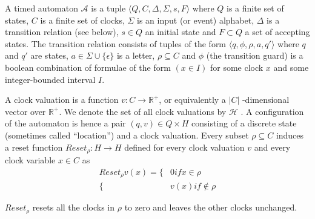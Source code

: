 \documentclass[]{sigplanconf}
\begin{document}
\begin{defns}
A timed automaton  $\mathcal{A}$ is a tuple $\langle Q,C,\Delta ,\Sigma, s,F\rangle$ where $Q$ is a finite set of states, $C$ is a finite set of clocks, $\Sigma$ is an input (or event) alphabet, $\Delta$ is a transition relation (see below), $s \in Q$ an initial state and $F \subset Q$ a set of accepting states. The transition relation consists of tuples of the form $\langle q ,\phi ,\rho, a, q' \rangle$ where $q$ and $q'$  are states, $a \in \Sigma \cup \{\epsilon \}$ is a letter, $\rho \subseteq C$ and $\phi$ (the transition guard) is a boolean combination of formulae of the form $(x \in I)$ for some clock $x$ and some integer-bounded interval $I$.
\end{defns}

A clock valuation is a function $v \colon C \rightarrow \mathbb{R}^+$, or equivalently a $|C|$ -dimensional vector over $\mathbb{R}^+$. We denote the set of all clock valuations by $\mathcal{H}$ . A configuration of the automaton is hence a pair $(q,v) \in Q \times H$ consisting of a discrete state (sometimes called “location”) and a clock valuation. Every subset $\rho \subseteq C$ induces a reset function $Reset_\rho : H \rightarrow H$ defined for every clock valuation $v$ and every clock variable $x \in C$ as
\begin{equation}\label{timed_automaton}
\begin{split}
Reset_\rho v(x)  =  \{     &  0 if x \in \rho \\
                    \{    & v(x) if \notin \rho
\end{split}
\end{equation}

$Reset_\rho$ resets all the clocks in $\rho$ to zero and leaves the other clocks unchanged.
\end{document}
